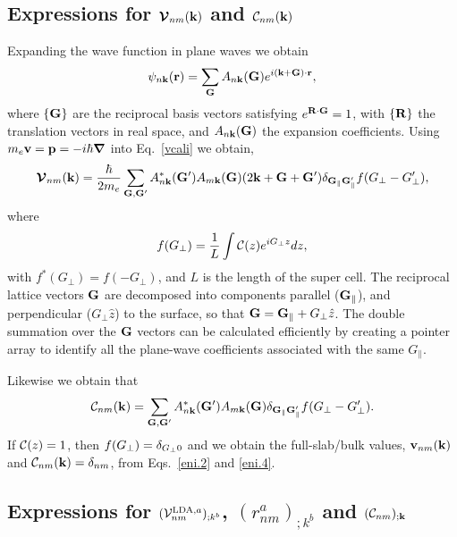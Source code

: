 \documentclass[floatfix,prb,aps,superscriptaddress,11pt,preprint,letterpaper]{revtex4}
\def\chon{black}
\begin{document}
\subsection{ Expressions for 
\texorpdfstring{${\boldsymbol{\mathcal{\cal V}}}_{nm}(\mathbf{k})$}{que} 
and 
\texorpdfstring{${\cal C}_{nm}(\mathbf{k})$}{que}
}\label{calpcalc}

Expanding the wave function in plane waves we obtain
\begin{align}\label{eni.1}
\psi_{n\mathbf{k}}(\mathbf{r})=\sum_{\mathbf{G}} A_{n\mathbf{k}}(\mathbf{G})e^{i(\mathbf{k}+\mathbf{G})\cdot\mathbf{r}}
,
\end{align}
where $\{\mathbf{G}\}$ are the reciprocal basis vectors satisfying
$e^{\mathbf{R}\cdot\mathbf{G}}=1$, with $\{\mathbf{R}\}$ the translation vectors in real
space, and $A_{n\mathbf{k}}(\mathbf{G})$ {\color{\chon} the} expansion coefficients. Using
$m_e\mathbf{v}=\mathbf{p}=-i\hbar\boldsymbol{\nabla}$ into 
Eq.~\eqref{vcali}
we obtain,\cite{mendozaPRB06}
\begin{align}\label{eni.2}
\boldsymbol{\mathcal{\cal V}}_{nm}(\mathbf{k})=
\frac{\hbar}{2m_e}
\sum_{\mathbf{G},\mathbf{G}'} A^*_{n\mathbf{k}}(\mathbf{G}')  A_{m\mathbf{k}}(\mathbf{G})
(2\mathbf{k}+\mathbf{G}+\mathbf{G}')
\delta_{\mathbf{G}_\parallel \mathbf{G}'_\parallel}  
f(G_\perp-G'_\perp)
,
\end{align}   
where
\begin{align}\label{vnl.9}
f(G_\perp)=\frac{1}{L}\int{\mathbf{\cal C}}(z) e^{iG_\perp z}dz  
 ,
\end{align}
with $f^*(G_\perp)=f(-G_\perp)$,
and $L$
is the length of the super cell. 
{\color{\chon} The} reciprocal lattice vectors $\mathbf{G}$ are 
decomposed into components
{\color{\chon} parallel ($\mathbf{G}_\parallel$), and perpendicular ($G_\perp \hat z$)} 
to the surface, so
that $\mathbf{G} = \mathbf{G}_\parallel + G_\perp\hat z$.
The double summation over the $\mathbf{G}$ vectors can be 
{\color{\chon} calculated efficiently} by  
creating a pointer array to identify all the plane-wave coefficients  
associated with the same $G_\parallel$.  

Likewise we obtain that
\begin{align}\label{eni.4}
{\mathbf{\cal C}}_{nm}(\mathbf{k})=
\sum_{\mathbf{G},\mathbf{G}'} A^*_{n\mathbf{k}}(\mathbf{G}')  A_{m\mathbf{k}}(\mathbf{G})
\delta_{\mathbf{G}_\parallel \mathbf{G}'_\parallel} 
f(G_\perp-G'_\perp)
.
\end{align}  
If ${\mathbf{\cal C}}(z)=1$, {\color{\chon} then $f(G_\perp)=\delta_{G_\perp 0}$ and we 
obtain the full-slab/bulk values, 
$\mathbf{v}_{nm}(\mathbf{k})$ and ${\mathbf{\cal C}}_{nm}(\mathbf{k})=\delta_{nm}$,
from Eqs.~\eqref{eni.2} and \eqref{eni.4}}.

\subsection{Expressions for 
\texorpdfstring{$({\mathbf{\cal V}}^{\mathrm{LDA},a}_{nm})_{;k^b}$}{Vnonlocal},
\texorpdfstring{$(r^a_{nm})_{;k^b}$}{Vnonlocal}
and \texorpdfstring{$({\mathbf{\cal C}}_{nm})_{;\mathbf{k}}$}{Vnonlocal}
}\label{appvnl}
\end{document}
